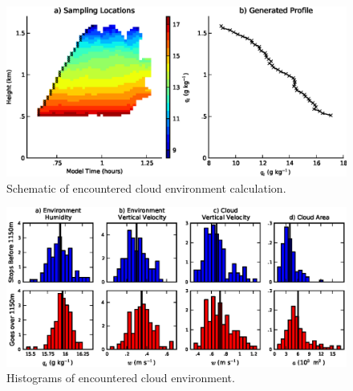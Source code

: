 \documentclass[acp]{copernicus}
\begin{document}
\begin{figure}[t]
\vspace*{2mm}
\begin{center}
\includegraphics[width=\textwidth]{./figures/cloud_environment_schematic}
\end{center}
\caption{Schematic of encountered cloud environment calculation.}
\label{fig:cloud_environment_schematic}
\end{figure}

\begin{figure}[t]
\vspace*{2mm}
\begin{center}
\includegraphics[width=\textwidth]{./figures/cloud_environment_histograms}
\end{center}
\caption{Histograms of encountered cloud environment.}
\label{fig:cloud_envionment_histograms}
\end{figure}
\end{document}

